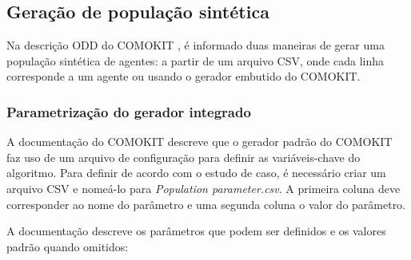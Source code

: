 \subsection{Geração de população sintética}

Na descrição ODD do COMOKIT \cite{ComokitDoc}, é informado duas maneiras de gerar uma população sintética de agentes: a partir de um arquivo CSV, onde cada linha corresponde a um agente ou usando o gerador embutido do COMOKIT.

\subsubsection{Parametrização do gerador integrado}

A documentação do COMOKIT \cite{ComokitDoc} descreve que o gerador padrão do COMOKIT faz uso de um arquivo de configuração para definir as variáveis-chave do algoritmo. Para definir de acordo com o estudo de caso, é necessário criar um arquivo CSV e nomeá-lo para \textit{Population parameter.csv}. A primeira coluna deve corresponder ao nome do parâmetro e uma segunda coluna o valor do parâmetro.

A documentação descreve os parâmetros que podem ser definidos e os valores padrão quando omitidos:

